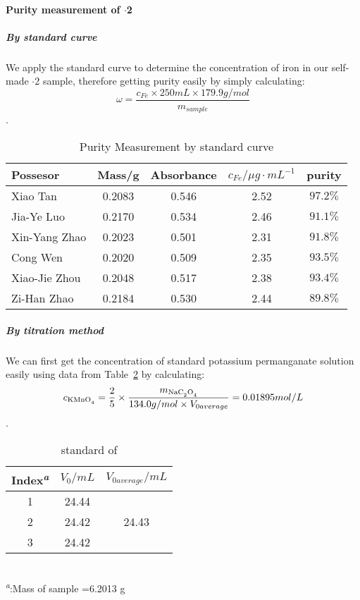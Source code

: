 \paragraph{Purity measurement of $\cdot$2}

\subparagraph{By standard curve}
We apply the standard curve to determine the concentration of iron in our self-made $\cdot$2 sample, therefore getting purity easily by simply calculating: \[\omega=\frac{c_{Fe}\times250mL\times179.9 g/mol}{m_{sample}}\].

\begin{table}[H]
    \caption{Purity Measurement by standard curve}
    \label{tab.Pcurve}
    \begin{tabular}{lcccc}
    \toprule
    Possesor      &Mass/g & Absorbance &$c_{Fe}/\mu g\cdot mL^{-1}$& purity   \\
    \midrule
    Xiao Tan      &0.2083 & 0.546      & 2.52   &$97.2\%$  \\
    Jia-Ye Luo    &0.2170 & 0.534      & 2.46   &$91.1\%$  \\
    Xin-Yang Zhao &0.2023 & 0.501      & 2.31   &$91.8\%$  \\
    Cong Wen      &0.2020 & 0.509      & 2.35   &$93.5\%$  \\
    Xiao-Jie Zhou &0.2048 & 0.517      & 2.38   &$93.4\%$  \\
    Zi-Han Zhao   &0.2184 & 0.530      & 2.44   &$89.8\%$  \\
    \bottomrule
    \end{tabular}
\end{table}

\subparagraph{By titration method}
We can first get the concentration of standard potassium permanganate solution easily using data from Table~\ref{tab.CalMn} by calculating: \[c_{\ce{KMnO4}}=\frac{2}{5}\times\frac{m_{\ce{NaC2O4}}}{134.0 g/mol\times V_{0average}}=0.01895mol/L\].

\begin{table}[H]
    \caption{standard of }
    \label{tab.CalMn}
    \begin{tabular}{ccc}
    \toprule
    Index\textsuperscript{\emph{a}}&$V_0/mL$&$V_{0average}/mL$\\
    \midrule
    1    & 24.44 &\\
    2    & 24.42 & 24.43\\
    3    & 24.42 &\\
    \bottomrule
    \end{tabular}\\
    \textsuperscript{\emph{a}}:Mass of sample =6.2013 g
\end{table}

